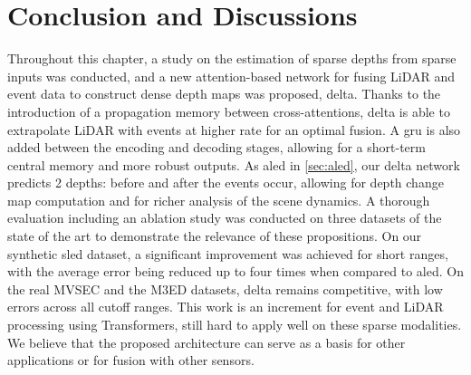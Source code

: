 \section{Conclusion and Discussions}\label{sec:delta:conclusion}
Throughout this chapter, a study on the estimation of sparse depths from sparse inputs was conducted, and a new attention-based network for fusing LiDAR and event data to construct dense depth maps was proposed, \acrshort{delta}. Thanks to the introduction of a propagation memory between cross-attentions, \acrshort{delta} is able to extrapolate LiDAR with events at higher rate for an optimal fusion. A \acrshort{gru} is also added between the encoding and decoding stages, allowing for a short-term central memory and more robust outputs. As \acrshort{aled} in \cref{sec:aled}, our \acrshort{delta} network predicts 2 depths: before and after the events occur, allowing for depth change map computation and for richer analysis of the scene dynamics. A thorough evaluation including an ablation study was conducted on three datasets of the state of the art to demonstrate the relevance of these propositions. On our synthetic \acrshort{sled} dataset, a significant improvement was achieved for short ranges, with the average error being reduced up to four times when compared to \acrshort{aled}. On the real MVSEC and the M3ED datasets, \acrshort{delta} remains competitive, with low errors across all cutoff ranges. This work is an increment for event and LiDAR processing using Transformers, still hard to apply well on these sparse modalities. We believe that the proposed architecture can serve as a basis for other applications or for fusion with other sensors.

